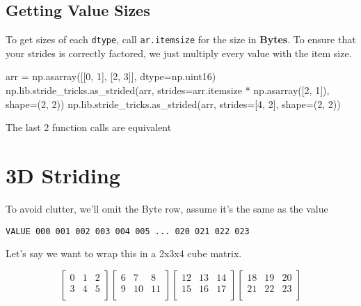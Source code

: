 \documentclass[oneside, 12pt]{report}
\begin{document}
\subsection{Getting Value Sizes}

To get sizes of each \verb+dtype+, call \verb+ar.itemsize+ for the size in \textbf{Bytes}. To ensure that your strides is correctly factored, we just multiply every value with the item size.

\begin{python}
arr = np.asarray([[0, 1], [2, 3]], dtype=np.uint16)
np.lib.stride_tricks.as_strided(arr,
                                strides=arr.itemsize * np.asarray([2, 1]),
                                shape=(2, 2))
np.lib.stride_tricks.as_strided(arr,
                                strides=[4, 2], shape=(2, 2))
\end{python}

The last 2 function calls are equivalent

\newpage
\section{3D Striding}

To avoid clutter, we'll omit the Byte row, assume it's the same as the value

\begin{verbatim}
VALUE 000 001 002 003 004 005 ... 020 021 022 023
\end{verbatim}

Let's say we want to wrap this in a 2x3x4 cube matrix.

\begin{equation*}
\begin{bmatrix}
0 & 1 & 2 \\
3 & 4 & 5 \\
\end{bmatrix}
\begin{bmatrix}
6 & 7 & 8 \\
9 & 10 & 11 \\
\end{bmatrix}
\begin{bmatrix}
12 & 13 & 14 \\
15 & 16 & 17 \\
\end{bmatrix}
\begin{bmatrix}
18 & 19 & 20 \\
21 & 22 & 23 \\
\end{bmatrix}
\end{equation*}
\end{document}
